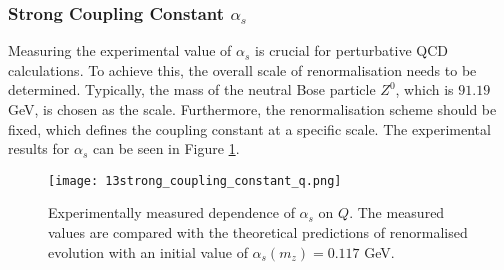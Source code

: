 \subsubsection{Strong Coupling Constant $\alpha_s$}
\label{10.13::strong_coupling_constant}
    Measuring the experimental value of $\alpha_s$ is crucial for perturbative QCD calculations.
    To achieve this, the overall scale of renormalisation needs to be determined.
    Typically, the mass of the neutral Bose particle $Z^0$, which is $91.19$ GeV, is chosen as the scale.
    Furthermore, the renormalisation scheme should be fixed, which defines the coupling constant at a specific scale.
    The experimental results for $\alpha_s$ can be seen in Figure \ref{fig::10.13::alpha_q_dependence}.

    \begin{figure}[t!]
        \texttt{[image: 13strong\_coupling\_constant\_q.png]}
        \caption[$\alpha_s$ dependence on $Q^2$]
        {Experimentally measured dependence of $\alpha_s$ on $Q$.
        The measured values are compared with the theoretical predictions of renormalised evolution with an initial value of $\alpha_s(m_z) = 0.117$ GeV.}
        \label{fig::10.13::alpha_q_dependence}
    \end{figure}
